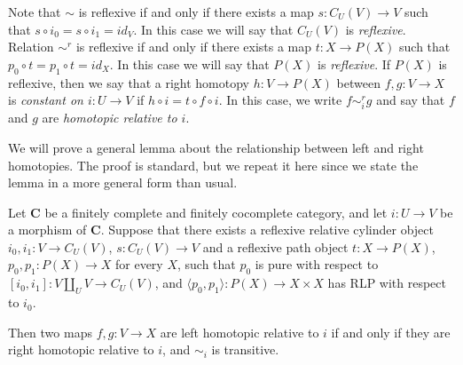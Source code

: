 \documentclass{amsart}
\theoremstyle{definition}
\newcommand{\cat}[1]{\mathbf{#1}}
\newcommand{\C}{\cat{C}}
\newcommand{\cyli}{i}
\begin{document}
Note that $\sim$ is reflexive if and only if there exists a map $s : C_U(V) \to V$ such that $s \circ \cyli_0 = s \circ \cyli_1 = id_V$.
In this case we will say that $C_U(V)$ is \emph{reflexive}.
Relation $\sim^r$ is reflexive if and only if there exists a map $t : X \to P(X)$ such that $p_0 \circ t = p_1 \circ t = id_X$.
In this case we will say that $P(X)$ is \emph{reflexive}.
If $P(X)$ is reflexive, then we say that a right homotopy $h : V \to P(X)$ between $f,g : V \to X$
is \emph{constant on $i : U \to V$} if $h \circ i = t \circ f \circ i$.
In this case, we write $f \sim^r_i g$ and say that $f$ and $g$ are \emph{homotopic relative to $i$}.

We will prove a general lemma about the relationship between left and right homotopies.
The proof is standard, but we repeat it here since we state the lemma in a more general form than usual.
\begin{lem}
Let $\C$ be a finitely complete and finitely cocomplete category, and let $i : U \to V$ be a morphism of $\C$.
Suppose that there exists a reflexive relative cylinder object $\cyli_0,\cyli_1 : V \to C_U(V)$, $s : C_U(V) \to V$
and a reflexive path object $t : X \to P(X)$, $p_0,p_1 : P(X) \to X$ for every $X$, such that $p_0$ is pure with respect to $[\cyli_0,\cyli_1] : V \amalg_U V \to C_U(V)$,
and $\langle p_0, p_1 \rangle : P(X) \to X \times X$ has RLP with respect to $\cyli_0$.

Then two maps $f,g : V \to X$ are left homotopic relative to $i$ if and only if they are right homotopic relative to $i$, and $\sim_i$ is transitive.
\end{lem}
\end{document}

